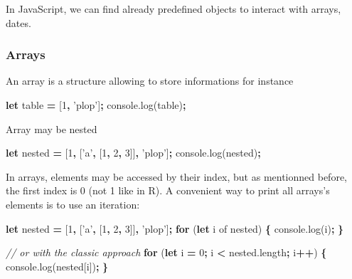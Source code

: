 \documentclass[]{book}
\newenvironment{Shaded}{\begin{snugshade}}{\end{snugshade}}
\newcommand{\AttributeTok}[1]{\textcolor[rgb]{0.77,0.63,0.00}{#1}}
\newcommand{\CommentTok}[1]{\textcolor[rgb]{0.56,0.35,0.01}{\textit{#1}}}
\newcommand{\ControlFlowTok}[1]{\textcolor[rgb]{0.13,0.29,0.53}{\textbf{#1}}}
\newcommand{\DecValTok}[1]{\textcolor[rgb]{0.00,0.00,0.81}{#1}}
\newcommand{\KeywordTok}[1]{\textcolor[rgb]{0.13,0.29,0.53}{\textbf{#1}}}
\newcommand{\NormalTok}[1]{#1}
\newcommand{\OperatorTok}[1]{\textcolor[rgb]{0.81,0.36,0.00}{\textbf{#1}}}
\newcommand{\StringTok}[1]{\textcolor[rgb]{0.31,0.60,0.02}{#1}}
\newcommand{\VariableTok}[1]{\textcolor[rgb]{0.00,0.00,0.00}{#1}}
\begin{document}
In JavaScript, we can find already predefined objects to interact with arrays, dates.

\hypertarget{arrays}{%
\subsubsection{Arrays}\label{arrays}}

An array is a structure allowing to store informations for instance

\begin{Shaded}
\begin{Highlighting}[]
\KeywordTok{let}\NormalTok{ table }\OperatorTok{=}\NormalTok{ [}\DecValTok{1}\OperatorTok{,} \StringTok{'plop'}\NormalTok{]}\OperatorTok{;}
\VariableTok{console}\NormalTok{.}\AttributeTok{log}\NormalTok{(table)}\OperatorTok{;}
\end{Highlighting}
\end{Shaded}

Array may be nested

\begin{Shaded}
\begin{Highlighting}[]
\KeywordTok{let}\NormalTok{ nested }\OperatorTok{=}\NormalTok{ [}\DecValTok{1}\OperatorTok{,}\NormalTok{ [}\StringTok{'a'}\OperatorTok{,}\NormalTok{ [}\DecValTok{1}\OperatorTok{,} \DecValTok{2}\OperatorTok{,} \DecValTok{3}\NormalTok{]]}\OperatorTok{,} \StringTok{'plop'}\NormalTok{]}\OperatorTok{;}
\VariableTok{console}\NormalTok{.}\AttributeTok{log}\NormalTok{(nested)}\OperatorTok{;}
\end{Highlighting}
\end{Shaded}

In arrays, elements may be accessed by their index, but as mentionned before, the first index is 0 (not 1 like in R). A convenient way to print all arrays's elements is to use an iteration:

\begin{Shaded}
\begin{Highlighting}[]
\KeywordTok{let}\NormalTok{ nested }\OperatorTok{=}\NormalTok{ [}\DecValTok{1}\OperatorTok{,}\NormalTok{ [}\StringTok{'a'}\OperatorTok{,}\NormalTok{ [}\DecValTok{1}\OperatorTok{,} \DecValTok{2}\OperatorTok{,} \DecValTok{3}\NormalTok{]]}\OperatorTok{,} \StringTok{'plop'}\NormalTok{]}\OperatorTok{;}
\ControlFlowTok{for}\NormalTok{ (}\KeywordTok{let}\NormalTok{ i of nested) }\OperatorTok{\{}
  \VariableTok{console}\NormalTok{.}\AttributeTok{log}\NormalTok{(i)}\OperatorTok{;}
\OperatorTok{\}}

\CommentTok{// or with the classic approach}
\ControlFlowTok{for}\NormalTok{ (}\KeywordTok{let}\NormalTok{ i }\OperatorTok{=} \DecValTok{0}\OperatorTok{;}\NormalTok{ i }\OperatorTok{<} \VariableTok{nested}\NormalTok{.}\AttributeTok{length}\OperatorTok{;}\NormalTok{ i}\OperatorTok{++}\NormalTok{) }\OperatorTok{\{}
  \VariableTok{console}\NormalTok{.}\AttributeTok{log}\NormalTok{(nested[i])}\OperatorTok{;}
\OperatorTok{\}}
\end{Highlighting}
\end{Shaded}
\end{document}
